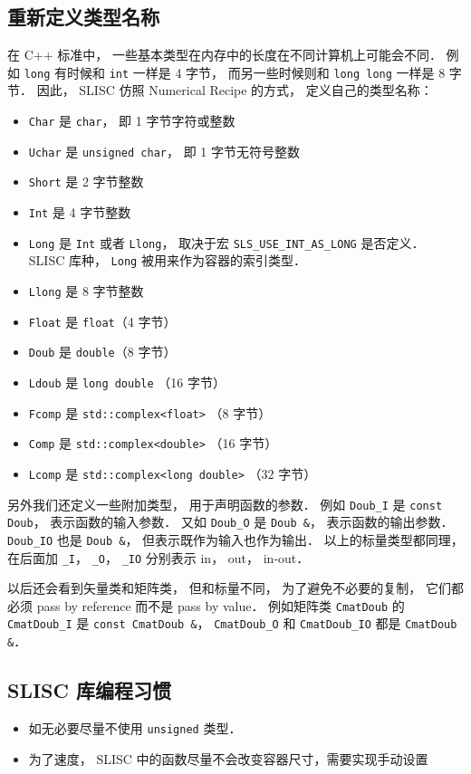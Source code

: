 \subsection{重新定义类型名称}
在 C++ 标准中， 一些基本类型在内存中的长度在不同计算机上可能会不同． 例如 \verb|long| 有时候和 \verb|int| 一样是 4 字节， 而另一些时候则和 \verb|long long| 一样是 8 字节． 因此， SLISC 仿照 Numerical Recipe 的方式， 定义自己的类型名称：
\begin{itemize}
\item \verb|Char| 是 \verb|char|， 即 1 字节字符或整数
\item \verb|Uchar| 是 \verb|unsigned char|， 即 1 字节无符号整数
\item \verb|Short| 是 2 字节整数
\item \verb|Int| 是 4 字节整数
\item \verb|Long| 是 \verb|Int| 或者 \verb|Llong|， 取决于宏 \verb|SLS_USE_INT_AS_LONG| 是否定义． SLISC 库种， \verb|Long| 被用来作为容器的索引类型．
\item \verb|Llong| 是 8 字节整数
\item \verb|Float| 是 \verb|float|（4 字节）
\item \verb|Doub| 是 \verb|double|（8 字节）
\item \verb|Ldoub| 是 \verb|long double| （16 字节）
\item \verb|Fcomp| 是 \verb|std::complex<float>| （8 字节）
\item \verb|Comp| 是 \verb|std::complex<double>| （16 字节）
\item \verb|Lcomp| 是 \verb|std::complex<long double>| （32 字节）
\end{itemize}
另外我们还定义一些附加类型， 用于声明函数的参数． 例如 \verb|Doub_I| 是 \verb|const Doub|， 表示函数的输入参数． 又如 \verb|Doub_O| 是 \verb|Doub &|， 表示函数的输出参数． \verb|Doub_IO| 也是 \verb|Doub &|， 但表示既作为输入也作为输出． 以上的标量类型都同理， 在后面加 \verb|_I|， \verb|_O|， \verb|_IO| 分别表示 in， out， in-out．

以后还会看到矢量类和矩阵类， 但和标量不同， 为了避免不必要的复制， 它们都必须 pass by reference 而不是 pass by value． 例如矩阵类 \verb|CmatDoub| 的 \verb|CmatDoub_I| 是 \verb|const CmatDoub &|， \verb|CmatDoub_O| 和 \verb|CmatDoub_IO| 都是 \verb|CmatDoub &|．

\subsection{SLISC 库编程习惯}
\begin{itemize}
\item 如无必要尽量不使用 \verb|unsigned| 类型．
\item 为了速度， SLISC 中的函数尽量不会改变容器尺寸，需要实现手动设置
\end{itemize}
